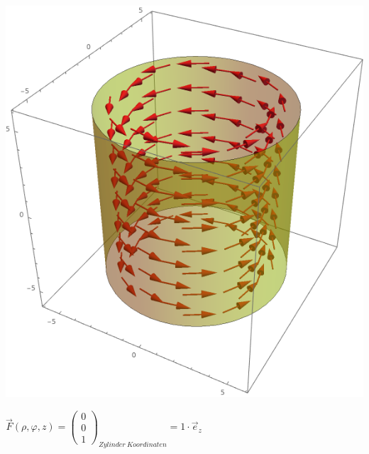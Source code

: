 					\formulaEnd
					\begin{center}

					\includegraphics[scale=0.4]{zylindric_phi.png}

					\end{center}




					\formulaBegin
					$\vec{F}(\rho, \varphi, z) = \left(\begin{array}{c} 0 \\ 0 \\ 1 \end{array}\right)_{Zylinder\ Koordinaten} = 1 \cdot \vec{e}_z$ \\

